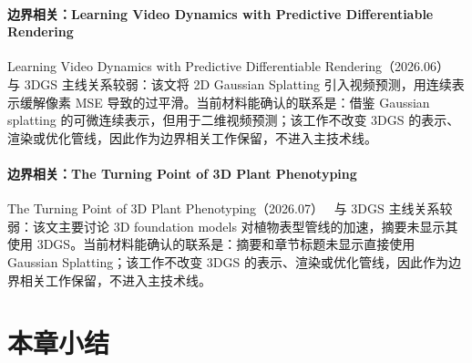 \paragraph{边界相关：Learning Video Dynamics with Predictive Differentiable Rendering}
Learning Video Dynamics with Predictive Differentiable Rendering（2026.06）~\cite{2606_31050} 与 3DGS 主线关系较弱：该文将 2D Gaussian Splatting 引入视频预测，用连续表示缓解像素 MSE 导致的过平滑。当前材料能确认的联系是：借鉴 Gaussian splatting 的可微连续表示，但用于二维视频预测；该工作不改变 3DGS 的表示、渲染或优化管线，因此作为边界相关工作保留，不进入主技术线。

\paragraph{边界相关：The Turning Point of 3D Plant Phenotyping}
The Turning Point of 3D Plant Phenotyping（2026.07）~\cite{2607_01753} 与 3DGS 主线关系较弱：该文主要讨论 3D foundation models 对植物表型管线的加速，摘要未显示其使用 3DGS。当前材料能确认的联系是：摘要和章节标题未显示直接使用 Gaussian Splatting；该工作不改变 3DGS 的表示、渲染或优化管线，因此作为边界相关工作保留，不进入主技术线。



\section*{本章小结}

